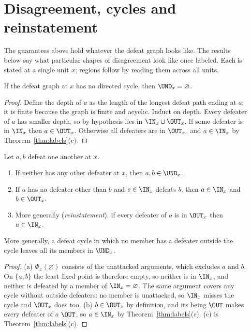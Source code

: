 \section{Disagreement, cycles and reinstatement}

The guarantees above hold whatever the defeat graph looks like. The results below say what particular shapes of disagreement look like once labeled. Each is stated at a single unit $x$; regions follow by reading them across all units.

\begin{proposition}\label{prop:acyclic}
If the defeat graph at $x$ has no directed cycle, then $\UND_x=\varnothing$.
\end{proposition}

\begin{proof}
Define the depth of $a$ as the length of the longest defeat path ending at $a$; it is finite because the graph is finite and acyclic. Induct on depth. Every defeater of $a$ has smaller depth, so by hypothesis lies in $\IN_x\cup\OUT_x$. If some defeater is in $\IN_x$ then $a\in\OUT_x$. Otherwise all defeaters are in $\OUT_x$, and $a\in\IN_x$ by Theorem~\ref{thm:labels}(c).
\end{proof}

\begin{proposition}\label{prop:mutual}
Let $a,b$ defeat one another at $x$.
\begin{enumerate}[label=(\alph*)]
\item If neither has any other defeater at $x$, then $a,b\in\UND_x$.
\item If $a$ has no defeater other than $b$ and $s\in\IN_x$ defeats $b$, then $a\in\IN_x$ and $b\in\OUT_x$.
\item More generally (\emph{reinstatement}), if every defeater of $a$ is in $\OUT_x$ then $a\in\IN_x$.
\end{enumerate}
More generally, a defeat cycle in which no member has a defeater outside the cycle leaves all its members in $\UND_x$.
\end{proposition}

\begin{proof}
(a) $\Phi_x(\varnothing)$ consists of the unattacked arguments, which excludes $a$ and $b$. On $\{a,b\}$ the least fixed point is therefore empty, so neither is in $\IN_x$, and neither is defeated by a member of $\IN_x=\varnothing$. The same argument covers any cycle without outside defeaters: no member is unattacked, so $\IN_x$ misses the cycle and $\OUT_x$ does too. (b) $b\in\OUT_x$ by definition, and its being $\OUT$ makes every defeater of $a$ $\OUT$, so $a\in\IN_x$ by Theorem~\ref{thm:labels}(c). (c) is Theorem~\ref{thm:labels}(c).
\end{proof}

